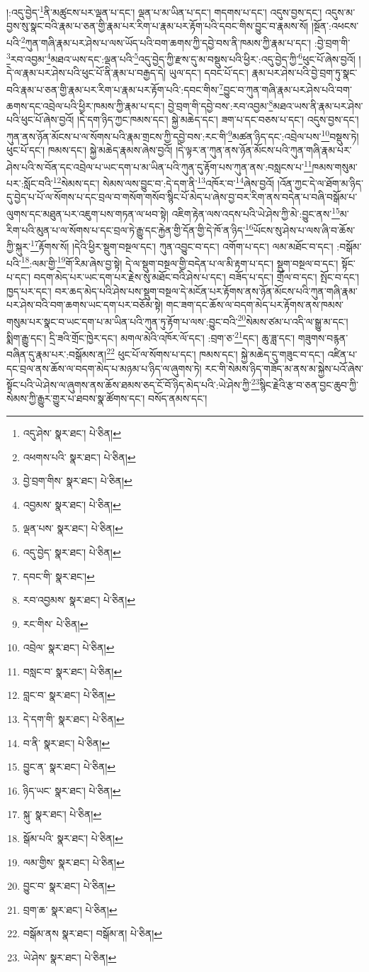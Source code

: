 །:འདུ་བྱེད་\footnote{འདུ་ཤེས་  སྣར་ཐང་།  པེ་ཅིན། }ནི་མཚུངས་པར་ལྡན་པ་དང་། ལྡན་པ་མ་ཡིན་པ་དང་། གདགས་པ་དང་། འདུས་བྱས་དང་། འདུས་མ་བྱས་སུ་སྣང་བའི་རྣམ་པ་ཅན་གྱི་རྣམ་པར་རིག་པ་རྣམ་པར་རྟོག་པའི་དབང་གིས་བྱུང་བ་རྣམས་སོ། །སྔོན་:འཕངས་པའི་\footnote{འཕགས་པའི་  སྣར་ཐང་།  པེ་ཅིན། }ཀུན་གཞི་རྣམ་པར་ཤེས་པ་ལས་ཡོད་པའི་བག་ཆགས་ཀྱི་དབྱེ་བས་ནི་ཁམས་ཀྱི་རྣམ་པ་དང་། :བྱེ་བྲག་གི་\footnote{བྱེ་བྲག་གིས་  སྣར་ཐང་།  པེ་ཅིན། }རབ་འབྱམ་\footnote{འབྱམས་  སྣར་ཐང་།  པེ་ཅིན། }མཐའ་ཡས་དང་:ལྡན་པའི་\footnote{ལྡན་པས་  སྣར་ཐང་།  པེ་ཅིན། }འདུ་བྱེད་ཀྱི་རྫས་དུ་མ་བསྡུས་པའི་ཕྱིར་:འདུ་བྱེད་ཀྱི་\footnote{འདུ་བྱེད་  སྣར་ཐང་།  པེ་ཅིན། }ཕུང་པོ་ཞེས་བྱའོ། །དེ་ལ་རྣམ་པར་ཤེས་པའི་ཕུང་པོ་ནི་རྣམ་པ་བརྒྱད་དེ། ཡུལ་དང་། དབང་པོ་དང་། རྣམ་པར་ཤེས་པའི་བྱེ་བྲག་ཏུ་སྣང་བའི་རྣམ་པ་ཅན་གྱི་རྣམ་པར་རིག་པ་རྣམ་པར་རྟོག་པའི་:དབང་གིས་\footnote{དབང་གི་  སྣར་ཐང་། }བྱུང་བ་ཀུན་གཞི་རྣམ་པར་ཤེས་པའི་བག་ཆགས་དང་འབྲེལ་པའི་ཕྱིར་ཁམས་ཀྱི་རྣམ་པ་དང་། བྱེ་བྲག་གི་དབྱེ་བས་:རབ་འབྱམ་\footnote{རབ་འབྱམས་  སྣར་ཐང་།  པེ་ཅིན། }མཐའ་ཡས་ནི་རྣམ་པར་ཤེས་པའི་ཕུང་པོ་ཞེས་བྱའོ། །དེ་དག་ཉིད་ཀྱང་ཁམས་དང་། སྐྱེ་མཆེད་དང་། ཟག་པ་དང་བཅས་པ་དང་། འདུས་བྱས་དང་། ཀུན་ནས་ཉོན་མོངས་པ་ལ་སོགས་པའི་རྣམ་གྲངས་ཀྱི་དབྱེ་བས་:རང་གི་\footnote{རང་གིས་  པེ་ཅིན། }མཚན་ཉིད་དང་:འབྲེལ་པས་\footnote{འབྲེལ་  སྣར་ཐང་།  པེ་ཅིན། }བསྡུས་ཏེ། ཕུང་པོ་དང་། ཁམས་དང་། སྐྱེ་མཆེད་རྣམས་ཞེས་བྱའོ། །དེ་ལྟར་ན་ཀུན་ནས་ཉོན་མོངས་པའི་ཀུན་གཞི་རྣམ་པར་ཤེས་པའི་ས་བོན་དང་འབྲེལ་པ་ཡང་དག་པ་མ་ཡིན་པའི་ཀུན་དུ་རྟོག་པས་ཀུན་ནས་:བསླངས་པ་\footnote{བསླང་བ་  སྣར་ཐང་།  པེ་ཅིན། }ཁམས་གསུམ་པར་:སློང་བའི་\footnote{བླང་བ་  སྣར་ཐང་།  པེ་ཅིན། }སེམས་དང་། སེམས་ལས་བྱུང་བ་:དེ་དག་ནི་\footnote{དེ་དག་གི་  སྣར་ཐང་།  པེ་ཅིན། }འཁོར་བ་\footnote{བ་ནི་  སྣར་ཐང་།  པེ་ཅིན། }ཞེས་བྱའོ། །འོན་ཀྱང་དེ་ལ་ཐོག་མ་ཉིད་དུ་བྱེད་པ་པོ་ལ་སོགས་པ་དང་བྲལ་བ་གསོག་གསོབ་སྙིང་པོ་མེད་པ་ཞེས་བྱ་བར་རིག་ནས་བདེན་པ་བཞི་བསྒོམ་པ་ལུགས་དང་མཐུན་པར་འཇུག་པས་གཏན་ལ་ཕབ་སྟེ། འཇིག་རྟེན་ལས་འདས་པའི་ཡེ་ཤེས་ཀྱི་མེ་:བྱུང་ནས་\footnote{བྱུང་ན་  སྣར་ཐང་།  པེ་ཅིན། }མ་རིག་པའི་མུན་པ་ལ་སོགས་པ་དང་བྲལ་ཏེ་རྒྱུ་དང་རྐྱེན་གྱི་དོན་གྱི་དེ་ཁོ་ན་ཉིད་\footnote{ཉིད་ཡང་  སྣར་ཐང་།  པེ་ཅིན། }ཡོངས་སུ་ཤེས་པ་ལས་ཞི་བ་ཆོས་ཀྱི་སྐུར་\footnote{སྐུ་  སྣར་ཐང་།  པེ་ཅིན། }རྟོགས་སོ། །དེའི་ཕྱིར་སྡུག་བསྔལ་དང་། ཀུན་འབྱུང་བ་དང་། འགོག་པ་དང་། ལམ་མཐོང་བ་དང་། :བསྒོམ་པའི་\footnote{སྒོམ་པའི་  སྣར་ཐང་།  པེ་ཅིན། }:ལམ་གྱི་\footnote{ལམ་གྱིས་  སྣར་ཐང་།  པེ་ཅིན། }གོ་རིམ་ཞེས་བྱ་སྟེ། དེ་ལ་སྡུག་བསྔལ་གྱི་བདེན་པ་ལ་མི་རྟག་པ་དང་། སྡུག་བསྔལ་བ་དང་། སྟོང་པ་དང་། བདག་མེད་པར་ཡང་དག་པར་རྗེས་སུ་མཐོང་བའི་ཤེས་པ་དང་། བཟོད་པ་དང་། གྲོལ་བ་དང་། སྤོང་བ་དང་། ཁྱད་པར་དང་། བར་ཆད་མེད་པའི་ཤེས་པས་སྡུག་བསྔལ་དེ་མངོན་པར་རྟོགས་ནས་ཉོན་མོངས་པའི་ཀུན་གཞི་རྣམ་པར་ཤེས་བའི་བག་ཆགས་ཡང་དག་པར་བཅོམ་སྟེ། གང་ཟག་དང་ཆོས་ལ་བདག་མེད་པར་རྟོགས་ནས་ཁམས་གསུམ་པར་སྣང་བ་ཡང་དག་པ་མ་ཡིན་པའི་ཀུན་ཏུ་རྟོག་པ་ལས་:བྱུང་བའི་\footnote{བྱུང་བ་  སྣར་ཐང་།  པེ་ཅིན། }སེམས་ཙམ་པ་འདི་ལ་སྒྱུ་མ་དང་། སྨིག་རྒྱུ་དང་། དྲི་ཟའི་གྲོང་ཁྱེར་དང་། མགལ་མེའི་འཁོར་ལོ་དང་། :བྲག་ཅ་\footnote{བྲག་ཆ་  སྣར་ཐང་།  པེ་ཅིན། }དང་། ཆུ་ཟླ་དང་། གཟུགས་བརྙན་བཞིན་དུ་རྣམ་པར་:བསྒོམས་ན།\footnote{བསྒོམ་ནས  སྣར་ཐང་། བསྒོམ་ན།  པེ་ཅིན། } ཕུང་པོ་ལ་སོགས་པ་དང་། ཁམས་དང་། སྐྱེ་མཆེད་དུ་གཟུང་བ་དང་། འཛིན་པ་དང་བྲལ་ནས་ཆོས་ལ་བདག་མེད་པ་མཉམ་པ་ཉིད་ལ་ཞུགས་ཏེ། རང་གི་སེམས་ཉིད་གཟོད་མ་ནས་མ་སྐྱེས་པའོ་ཞེས་སྟོང་པའི་ཡེ་ཤེས་ལ་ཞུགས་ནས་ཆོས་ཐམས་ཅད་ངོ་བོ་ཉིད་མེད་པའི་:ཡེ་ཤེས་ཀྱི་\footnote{ཡེ་ཤེས་  སྣར་ཐང་།  པེ་ཅིན། }སྙིང་རྗེའི་རྩ་བ་ཅན་བྱང་ཆུབ་ཀྱི་སེམས་ཀྱི་རྒྱུར་གྱུར་པ་ཐབས་སྣ་ཚོགས་དང་། བསོད་ནམས་དང་། 